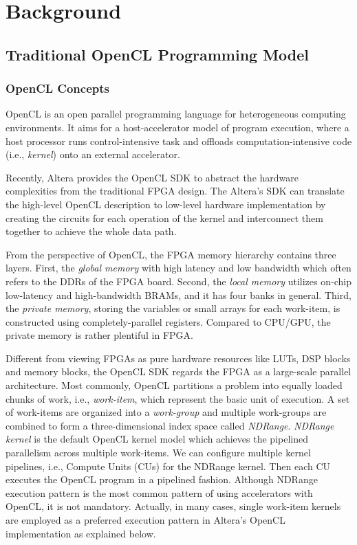 \section{Background}

\subsection{Traditional OpenCL Programming Model}

\subsubsection{OpenCL Concepts} 

OpenCL is an open parallel programming language for heterogeneous computing environments. It aims for a host-accelerator model of program execution, where a host processor runs control-intensive task and offloads computation-intensive code (i.e., \emph{kernel}) onto an external accelerator.

Recently, Altera provides the OpenCL SDK to abstract the hardware complexities from the traditional FPGA design. The Altera's SDK can translate the high-level OpenCL description to low-level hardware implementation by creating the circuits for each operation of the kernel and interconnect them together to achieve the whole data path.

From the perspective of OpenCL, the FPGA memory hierarchy  contains three layers. First, the \emph{global memory} with high latency and low bandwidth which often refers to the DDRs of the FPGA board. Second, the \emph{local memory} utilizes on-chip low-latency and high-bandwidth BRAMs, and it has four banks in general. Third, the \emph{private memory}, storing the variables or small arrays for each work-item, is constructed using completely-parallel registers. Compared to CPU/GPU, the private memory is rather plentiful in FPGA.

Different from viewing FPGAs as pure hardware resources like LUTs, DSP blocks and memory blocks, the OpenCL SDK regards the FPGA as a large-scale parallel architecture. Most commonly, OpenCL partitions a problem into equally loaded chunks of work, i.e., \emph{work-item}, which represent the basic unit of execution. A set of work-items are organized into a \emph{work-group} and multiple work-groups are combined to form a three-dimensional index space called \emph{NDRange}. \emph{NDRange kernel} is the default OpenCL kernel model which achieves the pipelined parallelism across multiple work-items. We can configure multiple kernel pipelines, i.e., Compute Units (CUs) for the NDRange kernel. Then each CU executes the OpenCL program in a pipelined fashion. Although NDRange execution pattern is the most common pattern of using accelerators with OpenCL, it is not mandatory. Actually, in many cases, single work-item kernels are employed as a preferred execution pattern in Altera's OpenCL implementation as explained below.


